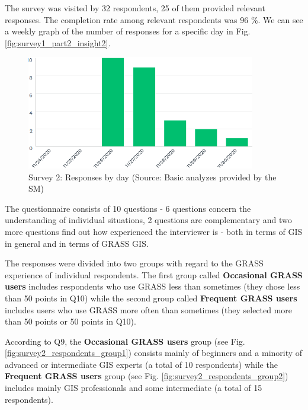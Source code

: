 \documentclass[a4paper,10pt,twoside]{article}
\begin{document}
\noindent The survey was visited by 32 respondents, 25 of them provided relevant responses. The completion rate among relevant respondents was 96 \%. We can see a weekly graph of the number of responses for a specific day in Fig. \ref{fig:survey1_part2_insight2}.

\vspace{0.3cm}
\begin{figure}[hbt!] 
\begin{center}
\includegraphics[width=10cm]{../surveys/analyzed_data/survey2_insight2.png} 
\caption[Survey 2: Responses by day]{Survey 2: Responses by day (Source: Basic analyzes provided by the SM)}
\label{fig:survey2_insight2}
\end{center}
\end{figure}

\noindent The questionnaire consists of 10 questions - 6 questions concern the understanding of individual situations, 2 questions are complementary and two more questions find out how experienced the interviewer is - both in terms of GIS in general and in terms of GRASS GIS.

The responses were divided into two groups with regard to the GRASS experience of individual respondents. The first group called \textbf{Occasional GRASS users} includes respondents who use GRASS less than sometimes (they chose less than 50 points in Q10) while the second group called \textbf{Frequent GRASS users} includes users who use GRASS more often than sometimes (they selected more than 50 points or 50 points in Q10).

According to Q9, the \textbf{Occasional GRASS users} group (see Fig. \ref{fig:survey2_respondents_group1}) consists mainly of beginners and a minority of advanced or intermediate GIS experts (a total of 10 respondents) while the \textbf{Frequent GRASS users} group (see Fig. \ref{fig:survey2_respondents_group2}) includes mainly GIS professionals and some intermediate (a total of 15 respondents).
\end{document}
